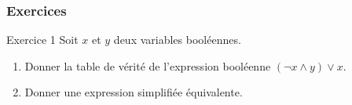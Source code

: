\documentclass[9pt]{beamer}
\newcounter{num}
\begin{document}
\begin{frame}
\frametitle{Exercices}

\begin{block}{Exercice 1}
Soit $x$ et $y$ deux variables booléennes. 
\begin{enumerate}
\item Donner la table de vérité de l'expression booléenne $ (\neg x \wedge y) \vee x$.
\item Donner une expression simplifiée équivalente.
\end{enumerate}
\end{block}

\end{frame}
\end{document}
